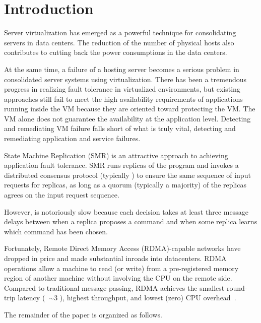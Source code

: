 \section{Introduction} \label{sec:intro}


Server virtualization has emerged as a powerful technique for consolidating servers in 
data centers. The reduction of the number of physical hosts also contributes to cutting 
back the power consumptions in the data centers.


At the same time, a failure of a hosting server becomes a serious problem in consolidated 
server systems using virtualization. There has been a tremendous progress in realizing fault 
tolerance in virtualized environments, but existing approaches still fail to meet the high 
availability requirements of applications running inside the VM because they are oriented 
toward protecting the VM. The VM alone does not guarantee the availability at the application 
level. Detecting and remediating VM failure falls short of what is truly vital, detecting and 
remediating application and service failures.

State Machine Replication (SMR) is an attractive approach to achieving application fault tolerance. 
SMR runs replicas of the program and invokes a distributed consensus protocol 
(typically \paxos) to ensure the same sequence of input requests for replicas, as long as a 
quorum (typically a majority) of the replicas agrees on the input request sequence.

However, \paxos is notoriously slow because each decision takes at least 
three message delays between when a replica proposes a command and when some replica learns which 
command has been chosen.

Fortunately, Remote Direct Memory Access (RDMA)-capable networks have dropped in price and made 
substantial inroads into datacenters. RDMA operations allow a machine to read (or write) from a 
pre-registered memory region of another machine without involving the CPU on the remote side. 
Compared to traditional message passing, RDMA achieves the smallest round-trip latency 
(~$\sim$3 \us), highest throughput, and lowest (zero) CPU overhead~\cite{pilaf:usenix14}.


The remainder of the paper is organized as follows.
